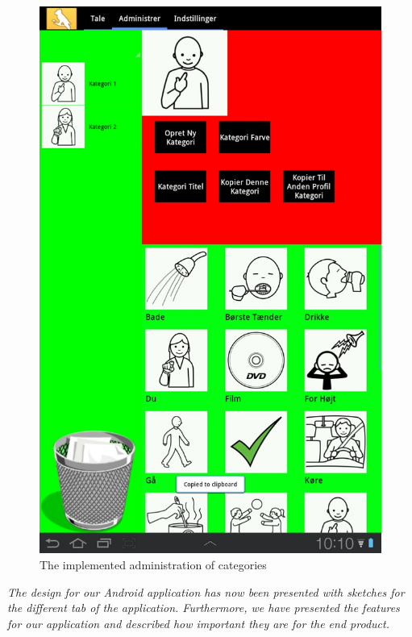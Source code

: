\begin{figure}
	\centering
		\includegraphics[scale=0.50]{input/images/admincateg.jpg}
	\caption{The implemented administration of categories}
	\label{fig:admin_cate}
\end{figure}


\textit{The design for our Android application has now been presented with sketches for the different tab of the application. Furthermore, we have presented the features for our application and described how important they are for the end product.} 